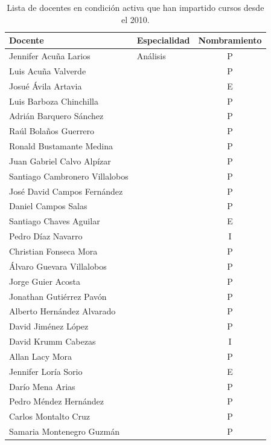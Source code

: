 \begin{longtable}[c]{|l|l|c|}
\caption{Lista de docentes en condición activa que han impartido cursos desde el 2010.}
\label{tab:docentes}\\
\hline
\rowcolor[HTML]{00C0F3}
Docente & Especialidad & Nombramiento \\ \hline
%
\endhead
%
Jennifer Acuña Larios & Análisis & P \\ \hline
Luis Acuña Valverde &  & P \\ \hline
Josué Ávila Artavia &  & E \\ \hline
Luis Barboza Chinchilla &  & P \\ \hline
Adrián Barquero Sánchez &  & P \\ \hline
Raúl Bolaños Guerrero &  & P \\ \hline
Ronald Bustamante Medina &  & P \\ \hline
Juan Gabriel Calvo Alpízar &  & P \\ \hline
Santiago Cambronero Villalobos &  & P \\ \hline
José David Campos Fernández &  & P \\ \hline
Daniel Campos Salas &  & P \\ \hline
Santiago Chaves Aguilar &  & E \\ \hline
Pedro Díaz Navarro &  & I \\ \hline
Christian Fonseca Mora &  & P \\ \hline
Álvaro Guevara Villalobos &  & P \\ \hline
Jorge Guier Acosta &  & P \\ \hline
Jonathan Gutiérrez Pavón &  & P \\ \hline
Alberto Hernández Alvarado &  & P \\ \hline
David Jiménez López &  & P \\ \hline
David Krumm Cabezas &  & I \\ \hline
Allan Lacy Mora &  & P \\ \hline
Jennifer Loría Sorio &  & E \\ \hline
Darío Mena Arias &  & P \\ \hline
Pedro Méndez Hernández &  & P \\ \hline
Carlos Montalto Cruz &  & P \\ \hline
Samaria Montenegro Guzmán &  & P \\ \hline

\end{longtable}
